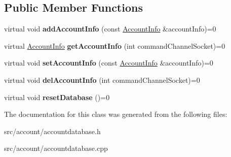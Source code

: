 \subsection*{Public Member Functions}
\begin{DoxyCompactItemize}
\item 
\mbox{\label{classInterfaceAccountDatabase_a54f1a9870a88598e8953759541a0b5cc}} 
virtual void {\bfseries add\+Account\+Info} (const \hyperlink{classAccountInfo}{Account\+Info} \&account\+Info)=0
\item 
\mbox{\label{classInterfaceAccountDatabase_a198df5c7964870e0feee9cf26a7dca7a}} 
virtual \hyperlink{classAccountInfo}{Account\+Info} {\bfseries get\+Account\+Info} (int command\+Channel\+Socket)=0
\item 
\mbox{\label{classInterfaceAccountDatabase_a6984fa5e427b80b6710b0cf122e52579}} 
virtual void {\bfseries set\+Account\+Info} (const \hyperlink{classAccountInfo}{Account\+Info} \&account\+Info)=0
\item 
\mbox{\label{classInterfaceAccountDatabase_a182c1d1ca50325dc73a5e00cafe4d0f2}} 
virtual void {\bfseries del\+Account\+Info} (int command\+Channel\+Socket)=0
\item 
\mbox{\label{classInterfaceAccountDatabase_af1489731737b67931d0601c964fa5883}} 
virtual void {\bfseries reset\+Database} ()=0
\end{DoxyCompactItemize}


The documentation for this class was generated from the following files\+:\begin{DoxyCompactItemize}
\item 
src/account/accountdatabase.\+h\item 
src/account/accountdatabase.\+cpp\end{DoxyCompactItemize}
